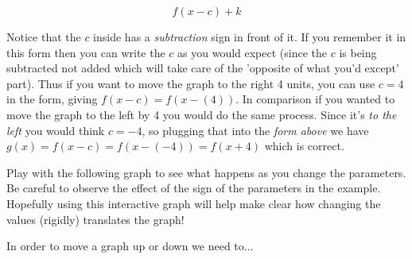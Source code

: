 \documentclass{ximera}
\begin{document}
    \[
        f(x - c) + k
    \]
    
    Notice that the $c$ inside has a \textit{subtraction} sign in front of it. If you remember it in this form then you can write the $c$ as you would expect (since the $c$ is being subtracted not added which will take care of the 'opposite of what you'd except' part). Thus if you want to move the graph to the right 4 units, you can use $c=4$ in the form, giving $f(x - c) = f(x - (4))$. In comparison if you wanted to move the graph to the left by 4 you would do the same process. Since it's \textit{to the left} you would think $c = -4$, so plugging that into the \textit{form above} we have $g(x) = f(x - c) = f(x - (-4) ) = f(x+4)$ which is correct.
    
    Play with the following graph to see what happens as you change the parameters. Be careful to observe the effect of the sign of the parameters in the example. Hopefully using this interactive graph will help make clear how changing the values (rigidly) translates the graph!
    
    
    
    \begin{problem}
        In order to move a graph up or down we need to...
        \begin{multipleChoice}
        \end{multipleChoice}
    \end{problem}
    
\end{document}
